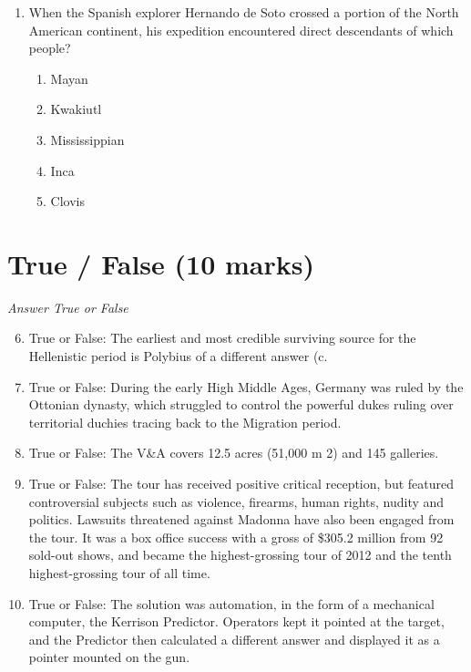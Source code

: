 \documentclass[12pt]{article}
\begin{document}
\begin{enumerate}[label=\arabic*.]
\begin{enumerate}[label=(\alph*)]
    \item meat to fruits and vegetables.
    \item species focused on grasses to fruits and vegetables.
    \item nuts and fruits to fish.
    \item nuts and fruits to species more focused on grasses.
    \item species focused on grasses to meat.
\end{enumerate}
\item When the Spanish explorer Hernando de Soto crossed a portion of the North American continent, his expedition encountered direct descendants of which people?
\begin{enumerate}[label=(\alph*)]
    \item Mayan
    \item Kwakiutl
    \item Mississippian
    \item Inca
    \item Clovis
\end{enumerate}
\end{enumerate}

\section*{True / False (10 marks)}
\textit{Answer True or False}
\begin{enumerate}[label=\arabic*.]
\setcounter{enumi}{5}
\item True or False: The earliest and most credible surviving source for the Hellenistic period is Polybius of a different answer (c.
\item True or False: During the early High Middle Ages, Germany was ruled by the Ottonian dynasty, which struggled to control the powerful dukes ruling over territorial duchies tracing back to the Migration period.
\item True or False: The V\&A covers 12.5 acres (51,000 m 2) and 145 galleries.
\item True or False: The tour has received positive critical reception, but featured controversial subjects such as violence, firearms, human rights, nudity and politics. Lawsuits threatened against Madonna have also been engaged from the tour. It was a box office success with a gross of \$305.2 million from 92 sold-out shows, and became the highest-grossing tour of 2012 and the tenth highest-grossing tour of all time.
\item True or False: The solution was automation, in the form of a mechanical computer, the Kerrison Predictor. Operators kept it pointed at the target, and the Predictor then calculated a different answer and displayed it as a pointer mounted on the gun.
\end{enumerate}
\end{document}
